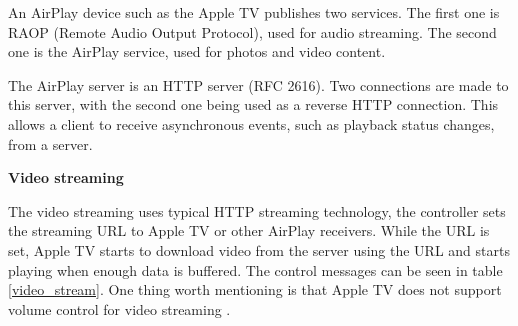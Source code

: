 An AirPlay device such as the Apple TV publishes two services. The first one is 
RAOP (Remote Audio Output Protocol), used for audio streaming. The second 
one is the AirPlay service, used for photos and video content.

The AirPlay server is an HTTP server (RFC 2616). Two connections are made to this 
server, with the second one being used as a reverse HTTP connection. This allows a 
client to receive asynchronous events, such as playback status changes, from a 
server.

\textbf{Video streaming}

The video streaming uses typical HTTP streaming technology, the controller sets 
the streaming URL to Apple TV or other AirPlay receivers. While the URL is set, 
Apple TV starts to download video from the server using the URL and starts 
playing when enough data is buffered. The control messages can be seen in 
table \ref{video_stream}. One thing worth mentioning is that Apple TV does
not support volume control for video streaming \cite{AirPlay-spec}.

\begin{table}[htb] 
\caption{AirPlay Video Control HTTP requests \label{video_stream}} 
\begin{center} 
\end{center} 
\end{table} 

